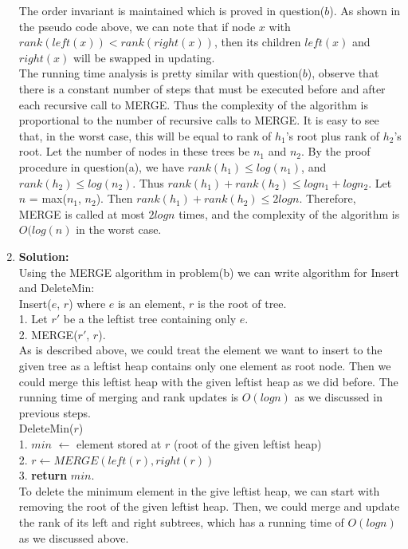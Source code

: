 \begin{enumerate}[label=(\alph*)]
	The order invariant is maintained which is proved in question($b$). As shown in the pseudo code above, we can note that if node $x$ with $rank(left(x)) < rank(right(x))$, then its children $left(x)$ and $right(x)$ will be swapped in updating.\\

	The running time analysis is pretty similar with question($b$), observe that there is a constant number of steps that must be executed before and after each recursive call to MERGE. Thus the complexity of the algorithm is proportional to the number of recursive calls to MERGE.  It is easy to see that, in the worst case, this will be equal to rank of $h_1$'s root plus rank of $h_2$'s root. Let the number of nodes in these trees be $n_1$ and $n_2$. By the proof procedure in question(a), we have $rank(h_1) \leq log(n_1)$, and $rank(h_2) \leq log(n_2)$. Thus $rank(h_1) + rank(h_2) \leq logn_1 + logn_2$. Let $n$ = max($n_1$, $n_2$). Then $rank(h_1) + rank(h_2) \leq 2logn$. Therefore, MERGE is called at most $2logn$ times, and the complexity of the algorithm is $O(log(n)$ in the worst case. \\

	\item \textbf{Solution:} \\
	Using the MERGE algorithm in problem(b) we can write algorithm for Insert and DeleteMin:\\

	Insert($e$, $r$) where $e$ is an element, $r$ is the root of tree.\\

	1. Let $r'$ be a the leftist tree containing only $e$.\\
	2. MERGE($r'$, $r$).\\

	As is described above, we could treat the element we want to insert to the given tree as a leftist heap contains only one element as root node. Then we could merge this leftist heap with the given leftist heap as we did before. The running time of merging and rank updates is $O(logn)$ as we discussed in previous steps.\\

	DeleteMin($r$)\\

	1. $min$ $\gets$ element stored at $r$ (root of the given leftist heap)\\
	2. $r \gets MERGE(left(r), right(r))$\\
	3. \textbf{return} $min$.\\

	To delete the minimum element in the give leftist heap, we can start with removing the root of the given leftist heap. Then, we could merge and update the rank of its left and right subtrees, which has a running time of $O(logn)$ as we discussed above. 

\end{enumerate}